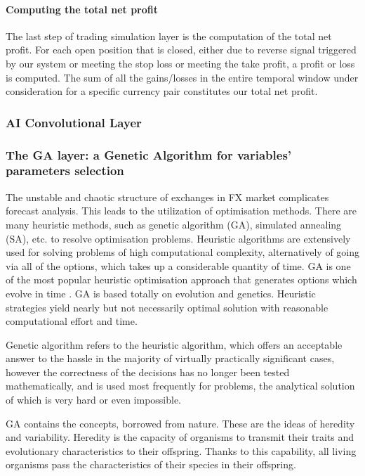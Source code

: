 \paragraph{\textbf{Computing the total net profit}}\mbox{}

The last step of trading simulation layer is the computation of the total net profit.  
For each open position that is closed, either due to reverse signal triggered by our system or meeting the stop loss or meeting the take profit, a profit or loss is computed. The sum of all the gains/losses in the entire temporal window under consideration for a specific currency pair constitutes our total net profit.


\subsubsection{AI Convolutional Layer}
\label{subsection:ai}


\subsubsection{The GA layer: a Genetic Algorithm for variables' parameters selection}
\label{subsection:ga}
The unstable and chaotic structure of exchanges in FX market complicates forecast analysis. This leads to the utilization of optimisation methods. There are many heuristic methods, such as genetic algorithm (GA), simulated annealing (SA), etc. to resolve optimisation problems. Heuristic algorithms are extensively used for solving problems of high computational complexity, alternatively of going via all of the options, which takes up a considerable quantity of time. GA is one of the most popular heuristic optimisation approach that generates options which evolve in time \cite{OZTURK2016170}. GA is based totally on evolution and genetics. Heuristic strategies yield nearly but not necessarily optimal solution with reasonable computational effort and time.

Genetic algorithm refers to the heuristic algorithm, which offers an acceptable answer to the hassle in the majority of virtually practically significant cases, however the correctness of the decisions has no longer been tested mathematically, and is used most frequently for problems, the analytical solution of which is very hard or even impossible.

GA contains the concepts, borrowed from nature. These are the ideas of heredity and variability. Heredity is the capacity of organisms to transmit their traits and evolutionary characteristics to their offspring. Thanks to this capability, all living organisms pass the characteristics of their species in their offspring.

